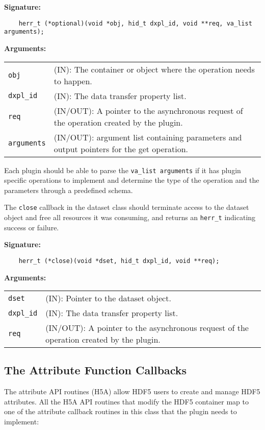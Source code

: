 \textbf{Signature:}
\begin{lstlisting}
    herr_t (*optional)(void *obj, hid_t dxpl_id, void **req, va_list arguments);
\end{lstlisting}

\textbf{Arguments:}\\
\begin{tabular}{l p{10cm}}
  {\tt obj} & (IN): The container or object where the operation needs to happen.\\
  {\tt dxpl\_id} & (IN): The data transfer property list.\\
  {\tt req} & (IN/OUT): A pointer to the asynchronous request of the operation created by the plugin.\\
  {\tt arguments} & (IN/OUT): argument list containing parameters and output pointers for the get operation. \\
\end{tabular}

Each plugin should be able to parse the {\tt va\_list arguments} if it has plugin specific operations to implement and determine the type of the operation and the parameters through a predefined schema. 

The {\tt close} callback in the dataset class should terminate access
to the dataset object and free all resources it was consuming, and
returns an {\tt herr\_t} indicating success or failure.

\textbf{Signature:}
\begin{lstlisting}
    herr_t (*close)(void *dset, hid_t dxpl_id, void **req);
\end{lstlisting}

\textbf{Arguments:}\\
\begin{tabular}{l p{10cm}}
  {\tt dset} & (IN): Pointer to the dataset object.\\
  {\tt dxpl\_id} & (IN): The data transfer property list.\\
  {\tt req} & (IN/OUT): A pointer to the asynchronous request of the
  operation created by the plugin.\\
\end{tabular}

\subsection{The Attribute Function Callbacks}
The attribute API routines (H5A) allow HDF5 users to create and manage
HDF5 attributes. All the H5A API routines that modify the HDF5
container map to one of the attribute callback routines in this
class that the plugin needs to implement:

